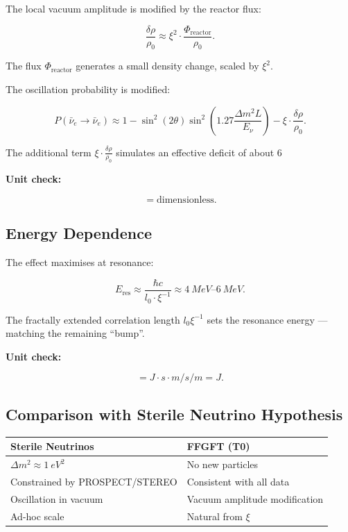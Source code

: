 	The local vacuum amplitude is modified by the reactor flux:
	
	\begin{equation}
		\frac{\delta \rho}{\rho_0} \approx \xi^2 \cdot \frac{\Phi_{\text{reactor}}}{\rho_0}.
	\end{equation}
	
	The flux \(\Phi_{\text{reactor}}\) generates a small density change, scaled by \(\xi^2\).
	
	The oscillation probability is modified:
	
	\begin{equation}
		P(\bar{\nu}_e \to \bar{\nu}_e) \approx 1 - \sin^2(2\theta) \sin^2\left(1.27 \frac{\Delta m^2 L}{E_\nu}\right) - \xi \cdot \frac{\delta \rho}{\rho_0}.
	\end{equation}
	
	The additional term \(\xi \cdot \frac{\delta \rho}{\rho_0}\) simulates an effective deficit of about 6%
	
	\textbf{Unit check:}
	
	\begin{equation}
		[P] = \text{dimensionless}.
	\end{equation}
	
	\subsection*{Energy Dependence}
	
	The effect maximises at resonance:
	
	\begin{equation}
		E_{\text{res}} \approx \frac{\hbar c}{l_0 \cdot \xi^{-1}} \approx \SIrange{4}{6}{MeV}.
	\end{equation}
	
	The fractally extended correlation length \(l_0 \xi^{-1}\) sets the resonance energy — matching the remaining “bump”.
	
	\textbf{Unit check:}
	
	\begin{equation}
		[E_{\text{res}}] = \si{J \cdot s} \cdot \si{m/s} / \si{m} = \si{J}.
	\end{equation}
	
	\subsection*{Comparison with Sterile Neutrino Hypothesis}
	
	\begin{center}
		\begin{tabular}{p{}p{}}
			\textbf{Sterile Neutrinos} & \textbf{FFGFT (T0)} \\
			\hline
			\(\Delta m^2 \approx \SI{1}{eV^{2}}\) & No new particles \\
			Constrained by PROSPECT/STEREO & Consistent with all data \\
			Oscillation in vacuum & Vacuum amplitude modification \\
			Ad-hoc scale & Natural from \(\xi\) \\
		\end{tabular}
	\end{center}
	
